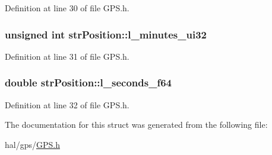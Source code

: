 Definition at line 30 of file G\+P\+S.\+h.

\hypertarget{structstrPosition_a5489ef5e7f8e6ee45990b262c80a7819_a5489ef5e7f8e6ee45990b262c80a7819}{
\subsubsection[{l\+\_\+minutes\+\_\+ui32}]{\setlength{\rightskip}{0pt plus 5cm}unsigned int str\+Position\+::l\+\_\+minutes\+\_\+ui32}}\label{structstrPosition_a5489ef5e7f8e6ee45990b262c80a7819_a5489ef5e7f8e6ee45990b262c80a7819}


Definition at line 31 of file G\+P\+S.\+h.

\hypertarget{structstrPosition_ae62d246c481c611e168ea86b70d5313b_ae62d246c481c611e168ea86b70d5313b}{
\subsubsection[{l\+\_\+seconds\+\_\+f64}]{\setlength{\rightskip}{0pt plus 5cm}double str\+Position\+::l\+\_\+seconds\+\_\+f64}}\label{structstrPosition_ae62d246c481c611e168ea86b70d5313b_ae62d246c481c611e168ea86b70d5313b}


Definition at line 32 of file G\+P\+S.\+h.



The documentation for this struct was generated from the following file\+:\begin{DoxyCompactItemize}
\item 
hal/gps/\hyperlink{GPS_8h}{G\+P\+S.\+h}\end{DoxyCompactItemize}
